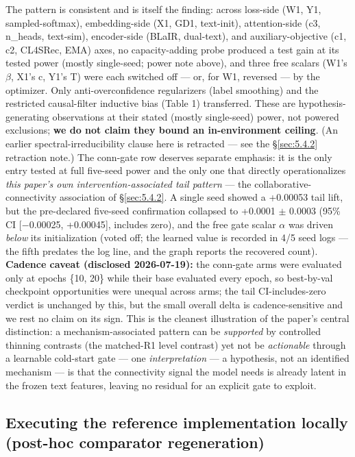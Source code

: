 The pattern is consistent and is itself the finding: across loss-side (W1, Y1, sampled-softmax), embedding-side (X1, GD1, text-init), attention-side (c3, n\_heads, text-sim), encoder-side (BLaIR, dual-text), and auxiliary-objective (c1, c2, CL4SRec, EMA) axes, no capacity-adding probe produced a test gain at its tested power (mostly single-seed; power note above), and three free scalars (W1's \ensuremath{\beta}, X1's c, Y1's T) were each switched off --- or, for W1, reversed --- by the optimizer. Only anti-overconfidence regularizers (label smoothing) and the restricted causal-filter inductive bias (Table 1) transferred. These are hypothesis-generating observations at their stated (mostly single-seed) power, not powered exclusions; \textbf{we do not claim they bound an in-environment ceiling}. (An earlier spectral-irreducibility clause here is retracted --- see the \S\ref{sec:5.4.2} retraction note.) The conn-gate row deserves separate emphasis: it is the only entry tested at full five-seed power and the only one that directly operationalizes \emph{this paper's own intervention-associated tail pattern} --- the collaborative-connectivity association of \S\ref{sec:5.4.2}. A single seed showed a +0.00053 tail lift, but the pre-declared five-seed confirmation collapsed to +0.0001 \ensuremath{\pm} 0.0003 (95\% CI {[}\ensuremath{-}0.00025, +0.00045{]}, includes zero), and the free gate scalar \ensuremath{\alpha} was driven \emph{below} its initialization (voted off; the learned value is recorded in 4/5 seed logs --- the fifth predates the log line, and the graph reports the recovered count). \textbf{Cadence caveat (disclosed 2026-07-19):} the conn-gate arms were evaluated only at epochs \{10, 20\} while their base evaluated every epoch, so best-by-val checkpoint opportunities were unequal across arms; the tail CI-includes-zero verdict is unchanged by this, but the small overall delta is cadence-sensitive and we rest no claim on its sign. This is the cleanest illustration of the paper's central distinction: a mechanism-associated pattern can be \emph{supported} by controlled thinning contrasts (the matched-R1 level contrast) yet not be \emph{actionable} through a learnable cold-start gate --- one \emph{interpretation} --- a hypothesis, not an identified mechanism --- is that the connectivity signal the model needs is already latent in the frozen text features, leaving no residual for an explicit gate to exploit.


\subsection{Executing the reference implementation locally (post-hoc comparator regeneration)}\label{sec:5.6}

